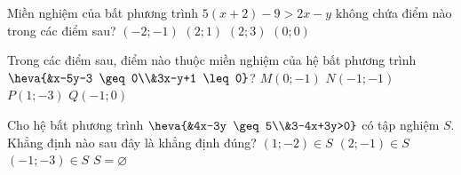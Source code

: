 \begin{ex}%
    Miền nghiệm của bất phương trình $5(x+2)-9>2x-y$ không chứa điểm nào trong các điểm sau?
    \choice
    {\True $(-2;-1)$}
    {$(2;1)$}
    {$(2;3)$}
    {$(0;0)$}
\end{ex}
\begin{ex}%
    Trong các điểm sau, điểm nào thuộc miền nghiệm của hệ bất phương trình $\heva{&x-5y-3 \geq 0\\&3x-y+1 \leq 0}$?
    \choice
    {$M(0;-1)$}
    {\True $N(-1;-1)$}
    {$P(1;-3)$}
    {$Q(-1;0)$}
\end{ex}
\begin{ex}%
    Cho hệ bất phương trình $\heva{&4x-3y \geq 5\\&3-4x+3y>0}$ có tập nghiệm $S$. Khẳng định nào sau đây là khẳng định đúng?
    \choice
    {$(1;-2) \in S$}
    {$(2;-1) \in S$}
    {$(-1;-3) \in S$}
    {\True $S=\varnothing$}
\end{ex}
